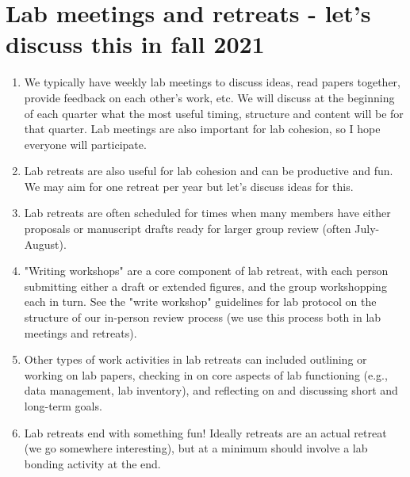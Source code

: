 \documentclass[12pt]{article}
\begin{document}
\section{Lab meetings and retreats - let's discuss this in fall 2021}
\begin{enumerate}
\item We typically have weekly lab meetings to discuss ideas, read papers together, provide feedback on each other's work, etc. We will discuss at the beginning of each quarter what the most useful timing, structure and content will be for that quarter.  Lab meetings are also important for lab cohesion, so I hope everyone will participate. 
\item Lab retreats are also useful for lab cohesion and can be productive and fun. We may aim for one retreat per year but let's discuss ideas for this.  
\item Lab retreats are often scheduled for times when many members have either proposals or manuscript drafts ready for larger group review (often July-August).
\item "Writing workshops" are a core component of lab retreat, with each person submitting either a draft or extended figures, and the group workshopping each in turn. See the "write workshop" guidelines for lab protocol on the structure of our in-person review process (we use this process both in lab meetings and retreats).
\item Other types of work activities in lab retreats can included outlining or working on lab papers, checking in on core aspects of lab functioning (e.g., data management, lab inventory), and reflecting on and discussing short and long-term goals. 
\item Lab retreats end with something fun! Ideally retreats are an actual retreat (we go somewhere interesting), but at a minimum should involve a lab bonding activity at the end.
\end{enumerate}
\end{document}

